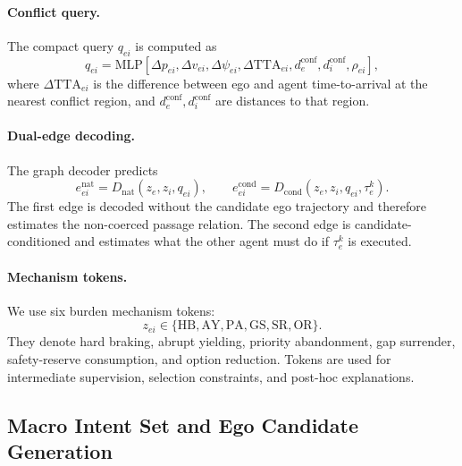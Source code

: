 \documentclass[10pt]{article}
\begin{document}
\paragraph{Conflict query.}
The compact query $q_{ei}$ is computed as
\begin{equation}
    q_{ei}
    =
    \mathrm{MLP}
    \left[
    \Delta p_{ei},
    \Delta v_{ei},
    \Delta \psi_{ei},
    \Delta \mathrm{TTA}_{ei},
    d^{\mathrm{conf}}_{e},
    d^{\mathrm{conf}}_{i},
    \rho_{ei}
    \right],
\end{equation}
where $\Delta \mathrm{TTA}_{ei}$ is the difference between ego and agent time-to-arrival at the nearest conflict region, and $d^{\mathrm{conf}}_e,d^{\mathrm{conf}}_i$ are distances to that region.

\paragraph{Dual-edge decoding.}
The graph decoder predicts
\begin{equation}
    e^{\mathrm{nat}}_{ei}
    =
    D_{\mathrm{nat}}(z_e,z_i,q_{ei}),
    \qquad
    e^{\mathrm{cond}}_{ei}
    =
    D_{\mathrm{cond}}(z_e,z_i,q_{ei},\tau^k_e).
\end{equation}
The first edge is decoded without the candidate ego trajectory and therefore estimates the non-coerced passage relation. The second edge is candidate-conditioned and estimates what the other agent must do if $\tau^k_e$ is executed.

\paragraph{Mechanism tokens.}
We use six burden mechanism tokens:
\begin{equation}
    z_{ei}\in
    \{
    \mathrm{HB},
    \mathrm{AY},
    \mathrm{PA},
    \mathrm{GS},
    \mathrm{SR},
    \mathrm{OR}
    \}.
\end{equation}
They denote hard braking, abrupt yielding, priority abandonment, gap surrender, safety-reserve consumption, and option reduction. Tokens are used for intermediate supervision, selection constraints, and post-hoc explanations.

\subsection{Macro Intent Set and Ego Candidate Generation}
\label{app:ego_candidates}
\end{document}
